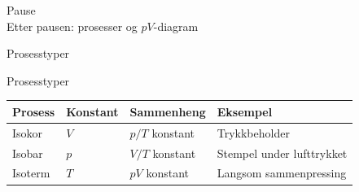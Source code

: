 \documentclass[aspectratio=169, 12pt]{beamer}
\begin{document}
\begin{frame}
\begin{center}
  \Huge{Pause}\\[8pt]
  {\large Etter pausen: prosesser og $pV$-diagram}
\end{center}
\end{frame}


\begin{frame}{Prosesstyper}

  \pause

\end{frame}

\begin{frame}{Prosesstyper}

  \begin{center}
  \begin{tabular}{llll}
    \textbf{Prosess} & \textbf{Konstant} & \textbf{Sammenheng} & \textbf{Eksempel} \\
    \hline
    Isokor   & $V$ & $p/T$ konstant & Trykkbeholder \\
    Isobar   & $p$ & $V/T$ konstant & Stempel under lufttrykket \\
    Isoterm  & $T$ & $pV$ konstant  & Langsom sammenpressing \\
  \end{tabular}
  \end{center}
  \pause

\end{frame}
\end{document}
